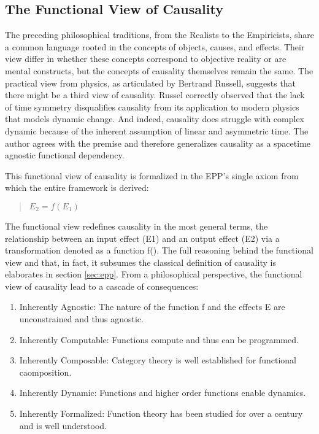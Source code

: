 \subsection{The Functional View of Causality}
\label{sec:philosophy_functional}

The preceding philosophical traditions, from the Realists to the Empiricists, share a common language rooted in the concepts of objects, causes, and effects. Their view differ in whether these concepts correspond to objective reality or are mental constructs, but the concepts of causality themselves remain the same. The practical view from physics, as articulated by Bertrand Russell, suggests that there might be a third view of causality. Russel correctly observed that the lack of time symmetry disqualifies causality from its application to modern physics that models dynamic change. And indeed, causality does struggle with complex dynamic because of the inherent assumption of linear and asymmetric time.  The author agrees with the premise and therefore generalizes causality as a spacetime agnostic functional dependency.   

This functional view of causality is formalized in the EPP's single axiom from which the entire framework is derived:
\begin{quotation}
\textbf{$E_{2} = f(E_{1})$}
\end{quotation}

The functional view redefines causality in the most general terms, the relationship between an input effect (E1) and an output effect (E2) via a transformation denoted as a function f(). The full reasoning behind the functional view and that, in fact, it subsumes the classical definition of causality is elaborates in section \ref{sec:epp}. From a philosophical perspective, the functional view of causality lead to a cascade of consequences:

\begin{enumerate}
	\item Inherently Agnostic: The nature of the function f and the effects E are unconstrained and thus agnostic. 
	\item Inherently Computable: Functions compute and thus can be programmed.
	\item Inherently Composable: Category theory is well established for functional caomposition. 
	\item Inherently Dynamic: Functions and higher order functions enable dynamics. 
	\item Inherently Formalized: Function theory has been studied for over a century and is well understood.
\end{enumerate}

